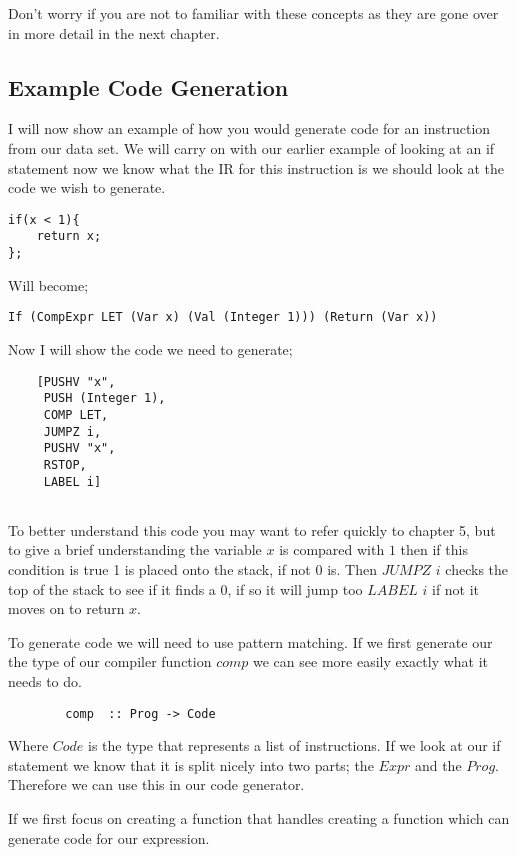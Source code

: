 Don't worry if you are not to familiar with these concepts as they are gone over in more detail in the next chapter.    

 
\subsection{Example Code Generation}

I will now show an example of how you would generate code for an instruction from our data set. We will carry on with our earlier example of looking at an if statement now we know what the IR for this instruction is we should look at the code we wish to generate. 

\begin{lstlisting}
if(x < 1){
	return x;
};
\end{lstlisting}
Will become;

\begin{lstlisting}
If (CompExpr LET (Var x) (Val (Integer 1))) (Return (Var x))
\end{lstlisting}
	
Now I will show the code we need to generate;

\begin{lstlisting}
	[PUSHV "x",         
	 PUSH (Integer 1), 
	 COMP LET,         
	 JUMPZ i,           
	 PUSHV "x",
	 RSTOP,           
	 LABEL i]
	
\end{lstlisting}

To better understand this code you may want to refer quickly to chapter 5, but to give a brief understanding the variable $x$ is compared with $1$ then if this condition is true 1 is placed onto the stack, if not 0 is. Then $JUMPZ$ $i$ checks the top of the stack to see if it finds a 0, if so it will jump too $LABEL$ $i$ if not it moves on to return $x$. 

To generate code we will need to use pattern matching. If we first generate our the type of our compiler function $comp$ we can see more easily exactly what it needs to do. 

\begin{lstlisting}
		comp  :: Prog -> Code
\end{lstlisting} 

Where $Code$ is the type that represents a list of instructions. If we look at our if statement we know that it is split nicely into two parts; the $Expr$ and the $Prog$. Therefore we can use this in our code generator. 

If we first focus on creating a function that handles creating a function which can generate code for our expression.

